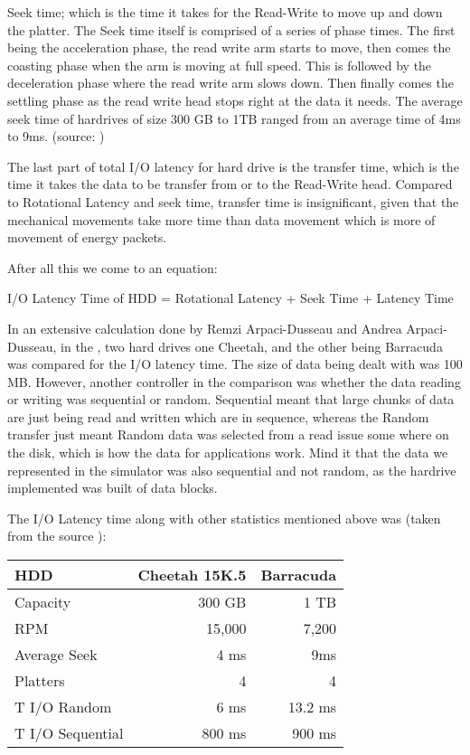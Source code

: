 \documentclass[12pt]{article}
\begin{document}
Seek time; which is the time it takes for the Read-Write to move up and down the platter.
The Seek time itself is comprised of a series of phase times. The first being the acceleration phase,
the read write arm starts to move, then comes the coasting phase when the arm is moving at full speed. This
is followed by the deceleration phase where the read write arm slows down. Then finally comes the
settling phase as the read write head stops right at the data it needs.
The average seek time of hardrives of size 300 GB to 1TB ranged from an average time of 4ms to 9ms.
(source: \cite{three} )

The last part of total I/O latency for hard drive is the transfer time, which is the time it takes the
data to be transfer from or to the Read-Write head. Compared to Rotational Latency and seek time, transfer
time is insignificant, given that the mechanical movements take more time than data movement which is more of
movement of energy packets.

After all this we come to an equation:

I/O Latency Time of HDD = Rotational Latency + Seek Time + Latency Time 

In an extensive calculation done by Remzi Arpaci-Dusseau and Andrea Arpaci-Dusseau, in the \cite{three},
two hard drives one Cheetah, and the other being Barracuda was compared for the I/O latency time. The size of
data being dealt with was 100 MB. However, another controller in the comparison was whether the data reading or writing
was sequential or random. Sequential meant that large chunks of data are just being read and written which are in
sequence, whereas the Random transfer just meant Random data was selected from a read issue some where on the disk,
which is how the data for applications work. Mind it that the data we represented in the simulator was also sequential
and not random, as the hardrive implemented was built of data blocks.

The I/O Latency time along with other statistics mentioned above was (taken from the source \cite{three}): 


\begin{tabular}{|l|rr|}
  \hline
  HDD & Cheetah 15K.5 & Barracuda\\
  \hline
  Capacity & 300 GB & 1 TB\\
  \hline
  RPM & 15,000 & 7,200\\
  \hline
  Average Seek & 4 ms & 9ms\\
  \hline
  Platters & 4 & 4\\
  \hline
  T I/O Random & 6 ms & 13.2 ms\\
  \hline
  T I/O Sequential & 800 ms & 900 ms\\
  \hline
\end {tabular}
\end{document}
